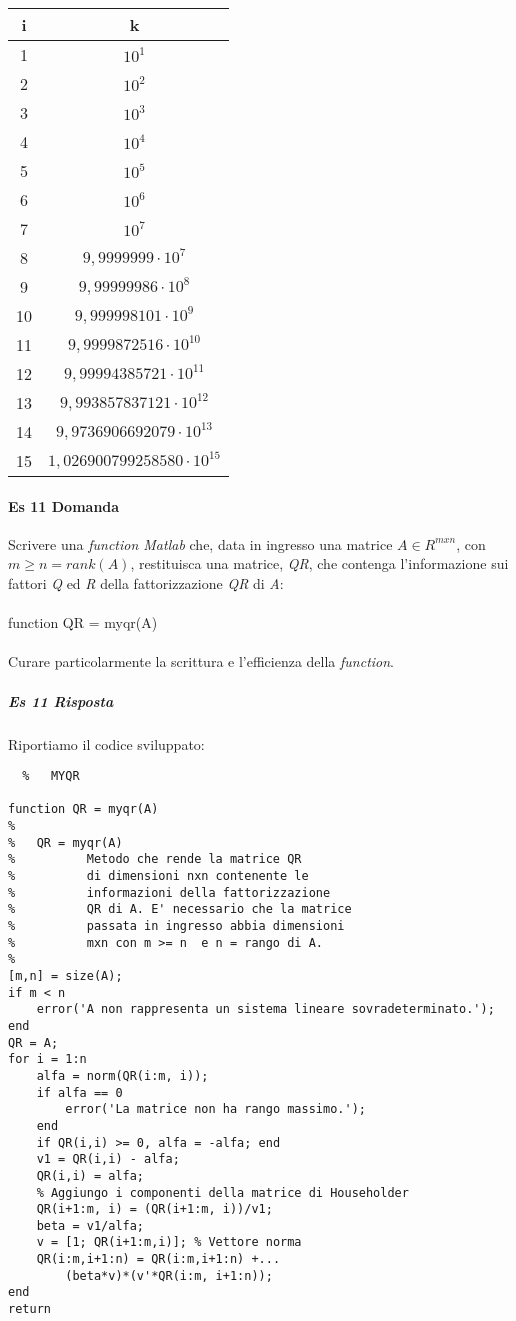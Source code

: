 \documentclass[a4paper]{report}
\begin{document}
\begin{tabular}{|c|c|}
	\hline
	i&k\\ \hline
	1&$10^1$ \\ \hline
	2&$10^2$         \\ \hline
	3&$10^3$         \\ \hline
	4&$10^4$         \\ \hline
	5&$10^5$         \\ \hline
	6&$10^6$         \\ \hline
	7&$10^7$         \\ \hline
	8&$9,9999999 \cdot10^7$  \\ \hline
	9&$9,99999986 \cdot10^8$        \\ \hline
	10&$9,999998101 \cdot10^9$     \\ \hline
	11&$9,9999872516 \cdot10^{10}$    \\ \hline
	12&$9,99994385721 \cdot10^{11}$   \\ \hline
	13&$9,993857837121 \cdot10^{12}$  \\ \hline
	14&$9,9736906692079 \cdot10^{13}$ \\ \hline
	15&$1,026900799258580\cdot10^{15}$\\ \hline
\end{tabular} 
\newpage
\paragraph{Es 11 Domanda}
Scrivere una \emph{function Matlab} che, data in ingresso una matrice $A \in R^{mxn}$, con $m \geq n = rank(A)$, restituisca una matrice, \emph{QR}, che contenga l'informazione sui fattori \emph{Q} ed \emph{R} della fattorizzazione \emph{QR} di \emph{A}:\\\\function QR = myqr(A)\\\\
Curare particolarmente la scrittura e l'efficienza della \emph{function}.
\subparagraph{Es 11 Risposta} Riportiamo il codice sviluppato:\\
\begin{lstlisting}	%	MYQR

function QR = myqr(A)
%
%   QR = myqr(A)
%          Metodo che rende la matrice QR 
%          di dimensioni nxn contenente le
%          informazioni della fattorizzazione
%          QR di A. E' necessario che la matrice 
%          passata in ingresso abbia dimensioni
%          mxn con m >= n  e n = rango di A.
%
[m,n] = size(A);
if m < n
	error('A non rappresenta un sistema lineare sovradeterminato.');
end
QR = A;
for i = 1:n
	alfa = norm(QR(i:m, i));
	if alfa == 0
		error('La matrice non ha rango massimo.');
	end
	if QR(i,i) >= 0, alfa = -alfa; end
	v1 = QR(i,i) - alfa;
	QR(i,i) = alfa;
	% Aggiungo i componenti della matrice di Householder
	QR(i+1:m, i) = (QR(i+1:m, i))/v1;
	beta = v1/alfa;
	v = [1; QR(i+1:m,i)]; % Vettore norma
	QR(i:m,i+1:n) = QR(i:m,i+1:n) +...
		(beta*v)*(v'*QR(i:m, i+1:n));
end
return
\end{lstlisting}
\newpage
\end{document}
